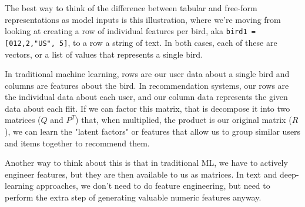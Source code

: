 \documentclass[11pt, table]{diazessay} %
\begin{document}
\begin{sloppypar}
The best way to think of the difference between tabular and free-form representations as model inputs is this illustration, where we're moving from looking at creating a row of individual features per bird, aka \texttt{bird1 = [012,2,"US", 5]}, to a row a string of text. In both cases, each of these are vectors, or a list of values that represents a single bird.

In traditional machine learning, rows are our user data about a single bird and columns are features about the bird. In recommendation systems, our rows are the individual data about each user, and our column data represents the given data about each flit.  If we can factor this matrix, that is decompose it into two matrices ($Q$ and $P^T$) that, when multiplied, the product is our original matrix ($R$), we can learn the "latent factors" or features that allow us to group similar users and items together to recommend them.

Another way to think about this is that in traditional ML, we have to actively engineer features, but they are then available to us as matrices. In text and deep-learning approaches, we don't need to do feature engineering, but need to perform the extra step of generating valuable numeric features anyway.


\end{sloppypar}
\end{document}

